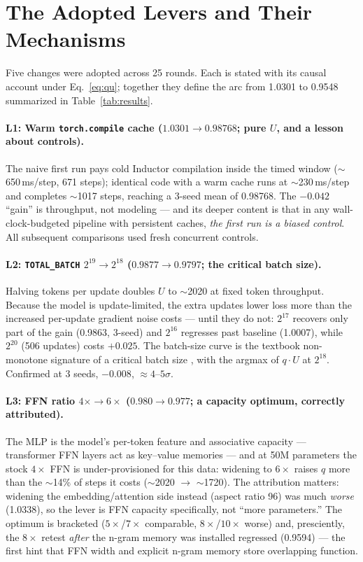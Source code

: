 \documentclass{article}
\begin{document}
\section{The Adopted Levers and Their Mechanisms}
\label{sec:levers}

Five changes were adopted across 25 rounds. Each is stated with its causal account under Eq.~\ref{eq:qu}; together they define the arc from 1.0301 to 0.9548 summarized in Table~\ref{tab:results}.

\paragraph{L1: Warm \texttt{torch.compile} cache ($1.0301 \rightarrow 0.98768$; pure $U$, and a lesson about controls).}
The naive first run pays cold Inductor compilation inside the timed window ($\sim$650\,ms/step, 671 steps); identical code with a warm cache runs at $\sim$230\,ms/step and completes $\sim$1017 steps, reaching a 3-seed mean of 0.98768. The $-0.042$ ``gain'' is throughput, not modeling --- and its deeper content is that in any wall-clock-budgeted pipeline with persistent caches, \emph{the first run is a biased control}. All subsequent comparisons used fresh concurrent controls.

\paragraph{L2: \texttt{TOTAL\_BATCH} $2^{19} \rightarrow 2^{18}$ ($0.9877 \rightarrow 0.9797$; the critical batch size).}
Halving tokens per update doubles $U$ to $\sim$2020 at fixed token throughput. Because the model is update-limited, the extra updates lower loss more than the increased per-update gradient noise costs --- until they do not: $2^{17}$ recovers only part of the gain (0.9863, 3-seed) and $2^{16}$ regresses past baseline (1.0007), while $2^{20}$ (506 updates) costs $+0.025$. The batch-size curve is the textbook non-monotone signature of a critical batch size \cite{mccandlish2018empirical}, with the argmax of $q \cdot U$ at $2^{18}$. Confirmed at 3 seeds, $-0.008$, $\approx 4$--$5\sigma$.

\paragraph{L3: FFN ratio $4\times \rightarrow 6\times$ ($0.980 \rightarrow 0.977$; a capacity optimum, correctly attributed).}
The MLP is the model's per-token feature and associative capacity --- transformer FFN layers act as key--value memories \cite{geva2021kv} --- and at 50M parameters the stock $4\times$ FFN is under-provisioned for this data: widening to $6\times$ raises $q$ more than the $\sim$14\% of steps it costs ($\sim$2020 $\rightarrow$ $\sim$1720). The attribution matters: widening the embedding/attention side instead (aspect ratio 96) was much \emph{worse} (1.0338), so the lever is FFN capacity specifically, not ``more parameters.'' The optimum is bracketed ($5\times$/$7\times$ comparable, $8\times$/$10\times$ worse) and, presciently, the $8\times$ retest \emph{after} the n-gram memory was installed regressed (0.9594) --- the first hint that FFN width and explicit n-gram memory store overlapping function.
\end{document}
